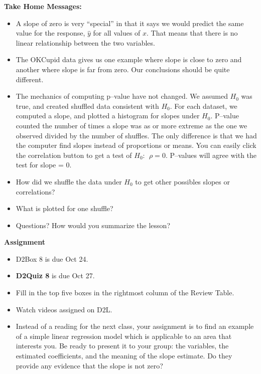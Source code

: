 \begin{center}
  {\bf Take Home Messages:}\vspace{-.4cm}
\end{center}
\begin{itemize}
  \item A slope of zero is very ``special'' in that it says we would
    predict the same value for the response, $\hat{y}$ for all values
    of $x$.  That means that there is no linear relationship between
    the two variables.
  \item The OKCupid data gives us one example where slope is close to
    zero and another where slope is far from zero.  Our conclusions
    should be quite different.
  \item The mechanics of computing p--value have not changed.  We
    assumed $H_0$ was true, and created shuffled data consistent with
    $H_0$.  For each dataset, we computed a slope, and plotted a
    histogram for slopes under $H_0$. P--value counted the number of
    times a slope was as or more extreme as the one we observed
    divided by the number of shuffles.  The only difference is that we
    had the computer find slopes instead of proportions or means.  You
    can easily click the correlation button to get a test of $H_0:\ \
    \rho = 0$. P--values will agree with the test for slope = 0.
  \item How did we shuffle the data under $H_0$ to get other possibles
    slopes or correlations?
  \item What is plotted for one shuffle?
 \item 
 Questions? How would you summarize the lesson? \vspace*{\fill}

\end{itemize}
\begin{students}
  \newpage
\end{students}

\noindent
{\bf Assignment} \vspace{-.2in}
\begin{itemize}
 \item  D2Box 8 is due Oct 24.
 \item {\bf D2Quiz 8} is due Oct 27.
\item Fill in the top five boxes in the rightmost column   of
  the Review Table.
\item Watch videos assigned on D2L.
\item Instead of a reading for the next class, your assignment is to
  find an example of a simple linear regression model which is
  applicable to an area that interests you.  Be ready to present it to
  your group:  the variables, the estimated coefficients, and the
  meaning of the slope estimate.  Do they provide any evidence that
  the slope is not zero?
\end{itemize}


